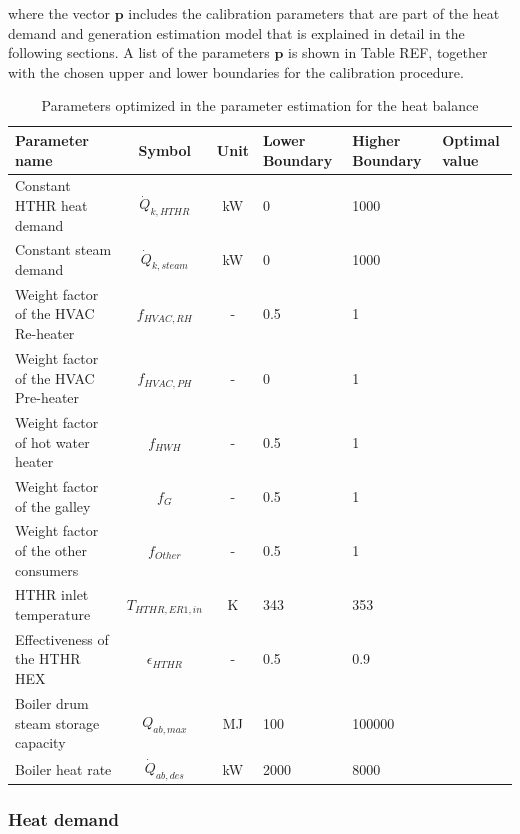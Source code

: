 \documentclass[preprint,12pt]{elsarticle}
\begin{document}
where the vector $\textbf{p}$ includes the calibration parameters that are part of the heat demand and generation estimation model that is explained in detail in the following sections. A list of the parameters $\textbf{p}$ is shown in Table REF, together with the chosen upper and lower boundaries for the calibration procedure.
\begin{table}
	\centering
	\begin{tabular}{p{3cm}ccp{1.6cm}p{1.6cm}p{1.2cm}}
		\hline 
		Parameter name & Symbol  & Unit & Lower Boundary & Higher Boundary & Optimal value \\ 
		\hline
		Constant HTHR heat demand	 & $\dot{Q}_{k,HTHR}$ & kW & 0 & 1000 &  \\ 
		Constant steam demand		 & $\dot{Q}_{k,steam}$ & kW & 0 & 1000 &  \\
		Weight factor of the HVAC Re-heater & $f_{HVAC,RH}$ & - & 0.5 & 1 &  \\ 
		Weight factor of the HVAC Pre-heater & $f_{HVAC,PH}$ & - & 0 & 1 &  \\ 
		Weight factor of hot water heater & $f_{HWH}$ & - & 0.5 & 1 &  \\ 
		Weight factor of the galley & $f_{G}$ & - & 0.5 & 1 &  \\ 
		Weight factor of the other consumers & $f_{Other}$ & - & 0.5 & 1 &  \\ 
		HTHR inlet temperature & $T_{HTHR,ER1,in}$ & K & 343 & 353 &  \\
		Effectiveness of the HTHR HEX & $\epsilon_{HTHR} $ & - & 0.5 & 0.9 &  \\
		Boiler drum steam storage capacity & $Q_{ab,max}$ & MJ & 100 & 100000 &  \\ 
		Boiler heat rate & $\dot{Q}_{ab,des}$ & kW & 2000 & 8000 &  \\ 
		\hline
	\end{tabular}
	\caption{Parameters optimized in the parameter estimation for the heat balance}
	\label{tab:ParameterEstimation} 
\end{table}
	
	
	
\subsubsection{Heat demand}
	
\end{document}
